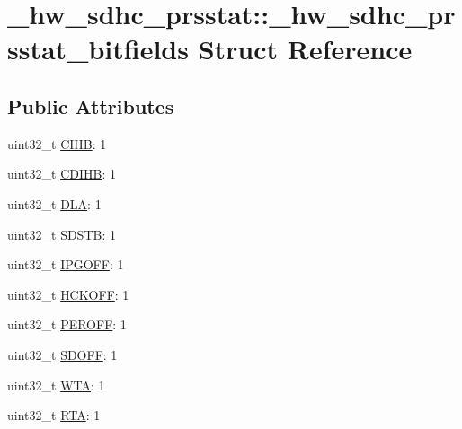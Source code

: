 \hypertarget{struct__hw__sdhc__prsstat_1_1__hw__sdhc__prsstat__bitfields}{}\section{\+\_\+hw\+\_\+sdhc\+\_\+prsstat\+:\+:\+\_\+hw\+\_\+sdhc\+\_\+prsstat\+\_\+bitfields Struct Reference}
\label{struct__hw__sdhc__prsstat_1_1__hw__sdhc__prsstat__bitfields}
\subsection*{Public Attributes}
\begin{DoxyCompactItemize}
\item 
uint32\+\_\+t \hyperlink{struct__hw__sdhc__prsstat_1_1__hw__sdhc__prsstat__bitfields_a83ed0e9b4fb63568a1432a595d7f9e11}{C\+I\+HB}\+: 1
\item 
uint32\+\_\+t \hyperlink{struct__hw__sdhc__prsstat_1_1__hw__sdhc__prsstat__bitfields_acb377c549cdc3c7919c58f12ec16d5c3}{C\+D\+I\+HB}\+: 1
\item 
uint32\+\_\+t \hyperlink{struct__hw__sdhc__prsstat_1_1__hw__sdhc__prsstat__bitfields_ad8468fe139f51cad9526742de7834d0a}{D\+LA}\+: 1
\item 
uint32\+\_\+t \hyperlink{struct__hw__sdhc__prsstat_1_1__hw__sdhc__prsstat__bitfields_a2d4ecc2c82fb75722cf3718faf103e7a}{S\+D\+S\+TB}\+: 1
\item 
uint32\+\_\+t \hyperlink{struct__hw__sdhc__prsstat_1_1__hw__sdhc__prsstat__bitfields_a9a70eaf457c53c7ab5d8a073129b9a2a}{I\+P\+G\+O\+FF}\+: 1
\item 
uint32\+\_\+t \hyperlink{struct__hw__sdhc__prsstat_1_1__hw__sdhc__prsstat__bitfields_a7abacf6457d09260b83b5a94519d3b1b}{H\+C\+K\+O\+FF}\+: 1
\item 
uint32\+\_\+t \hyperlink{struct__hw__sdhc__prsstat_1_1__hw__sdhc__prsstat__bitfields_adacc6a4a3facf85bdc1e308cd0c7e86a}{P\+E\+R\+O\+FF}\+: 1
\item 
uint32\+\_\+t \hyperlink{struct__hw__sdhc__prsstat_1_1__hw__sdhc__prsstat__bitfields_ad8d4cfdd841289836d81f89559ba8240}{S\+D\+O\+FF}\+: 1
\item 
uint32\+\_\+t \hyperlink{struct__hw__sdhc__prsstat_1_1__hw__sdhc__prsstat__bitfields_aacc7b3355c4cde6d6e24e160dee7a0a9}{W\+TA}\+: 1
\item 
uint32\+\_\+t \hyperlink{struct__hw__sdhc__prsstat_1_1__hw__sdhc__prsstat__bitfields_aec3103c27f41196d42a78dbdce14e70f}{R\+TA}\+: 1

\end{DoxyCompactItemize}
